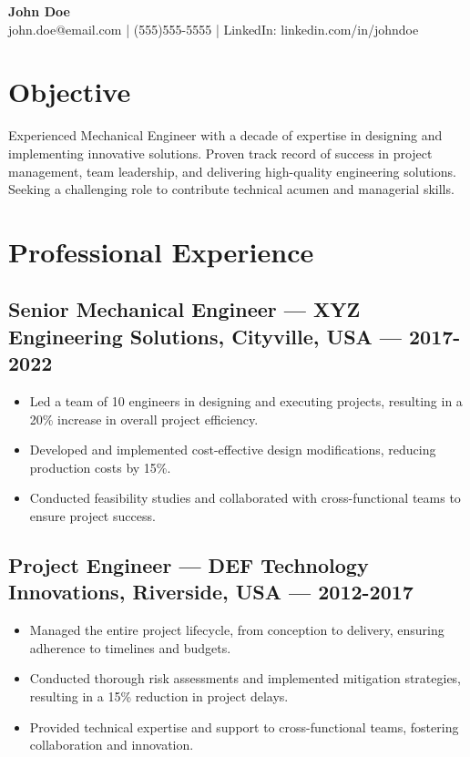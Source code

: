 \documentclass[a4paper,10pt]{article}
\begin{document}
\pagestyle{empty}

\begin{center}
    \textbf{\LARGE {John} {Doe}} \\
    {john.doe@email.com} | {(555)555-5555} | LinkedIn: {linkedin.com/in/johndoe}
\end{center}

\section*{Objective}
Experienced Mechanical Engineer with a decade of expertise in designing and implementing innovative solutions. Proven track record of success in project management, team leadership, and delivering high-quality engineering solutions. Seeking a challenging role to contribute technical acumen and managerial skills.

\section*{Professional Experience}

\subsection*{Senior Mechanical Engineer --- XYZ Engineering Solutions, Cityville, USA --- 2017-2022}

\begin{itemize}[left=0pt]
    \item Led a team of 10 engineers in designing and executing projects, resulting in a 20\% increase in overall project efficiency.
    \item Developed and implemented cost-effective design modifications, reducing production costs by 15\%.
    \item Conducted feasibility studies and collaborated with cross-functional teams to ensure project success.
\end{itemize}

\subsection*{Project Engineer --- DEF Technology Innovations, Riverside, USA --- 2012-2017}

\begin{itemize}[left=0pt]
    \item Managed the entire project lifecycle, from conception to delivery, ensuring adherence to timelines and budgets.
    \item Conducted thorough risk assessments and implemented mitigation strategies, resulting in a 15\% reduction in project delays.
    \item Provided technical expertise and support to cross-functional teams, fostering collaboration and innovation.
\end{itemize}
\end{document}
